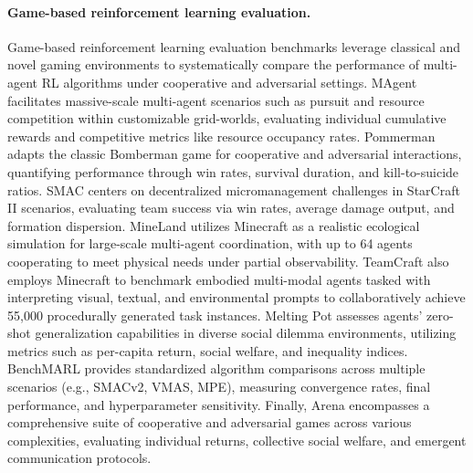 \paragraph{Game-based reinforcement learning evaluation.}
Game-based reinforcement learning evaluation benchmarks leverage classical and novel gaming environments to systematically compare the performance of multi-agent RL algorithms under cooperative and adversarial settings.
MAgent \citep{zheng2018magent} facilitates massive-scale multi-agent scenarios such as pursuit and resource competition within customizable grid-worlds, evaluating individual cumulative rewards and competitive metrics like resource occupancy rates. Pommerman \citep{resnick2018pommerman} adapts the classic Bomberman game for cooperative and adversarial interactions, quantifying performance through win rates, survival duration, and kill-to-suicide ratios. SMAC \citep{samvelyan2019starcraft} centers on decentralized micromanagement challenges in StarCraft II scenarios, evaluating team success via win rates, average damage output, and formation dispersion.
MineLand \citep{yu2024mineland} utilizes Minecraft as a realistic ecological simulation for large-scale multi-agent coordination, with up to 64 agents cooperating to meet physical needs under partial observability. TeamCraft \citep{long2024teamcraft} also employs Minecraft to benchmark embodied multi-modal agents tasked with interpreting visual, textual, and environmental prompts to collaboratively achieve 55,000 procedurally generated task instances. Melting Pot \citep{leibo2021scalable} assesses agents’ zero-shot generalization capabilities in diverse social dilemma environments, utilizing metrics such as per-capita return, social welfare, and inequality indices. BenchMARL \citep{bettini2024benchmarl} provides standardized algorithm comparisons across multiple scenarios (e.g., SMACv2, VMAS, MPE), measuring convergence rates, final performance, and hyperparameter sensitivity. Finally, Arena \citep{song2020arena} encompasses a comprehensive suite of cooperative and adversarial games across various complexities, evaluating individual returns, collective social welfare, and emergent communication protocols.

